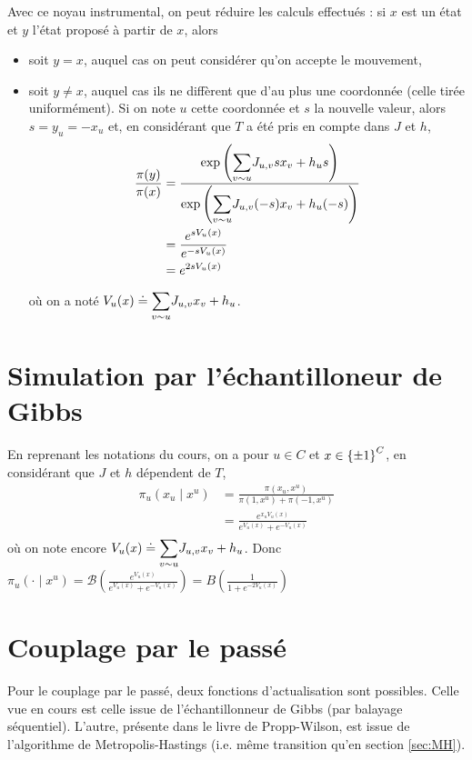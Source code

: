 \documentclass[a4paper,11pt]{article}
\begin{document}
Avec ce noyau instrumental, on peut réduire les calculs effectués : si $x$ est un état et $y$ l'état proposé à partir de $x$, alors
\begin{itemize}
	\item soit $y = x$, auquel cas on peut considérer qu'on accepte le mouvement,
	\item soit $y \neq x$, auquel cas ils ne diffèrent que d'au plus une coordonnée (celle tirée uniformément). Si on note $u$ cette coordonnée et $s$ la nouvelle valeur, alors $s = y_u = - x_u$ et, en considérant que $T$ a été pris en compte dans $J$ et $h$,
	\begin{align*}
	\frac{\pi(y)}{\pi(x)}
	&= \frac{\exp \left( \displaystyle{\sum_{v \sim u}^{}} J_{u,v} s x_{v} + h_{u} s \right)}{\exp \left( \displaystyle{\sum_{v \sim u}^{}} J_{u,v} (-s) x_{v} + h_{u} (-s) \right)}\\
	&= \frac{e^{s V_u(x)}}{e^{-s V_u(x)}}\\
	&= e^{2 s V_u(x)}
	\end{align*}
	où on a noté $V_u(x) \doteq \displaystyle{\sum_{v \sim u}^{}} J_{u,v} x_v + h_u$.
\end{itemize}

\section{Simulation par l'échantilloneur de Gibbs}

En reprenant les notations du cours, on a pour $u \in C$ et $x \in \left\lbrace \pm 1 \right\rbrace^C$, en considérant que $J$ et $h$ dépendent de $T$,
\begin{align*}
\pi_u(x_u \mid x^u)
&= \frac{\pi(x_u,x^u)}{\pi(1,x^u) + \pi(-1,x^u)}\\
&= \frac{e^{x_u V_u(x)}}{e^{V_u(x)} + e^{-V_u(x)}}
\end{align*}
où on note encore $V_u(x) \doteq \displaystyle{\sum_{v \sim u}^{}} J_{u,v} x_v + h_u$. Donc $\pi_u(\cdot \mid x^u) = \mathcal B(\frac{e^{V_u(x)}}{e^{V_u(x)} + e^{-V_u(x)}}) = B(\frac{1}{1 + e^{-2V_u(x)}})$

\section{Couplage par le passé}

Pour le couplage par le passé, deux fonctions d'actualisation sont possibles. Celle vue en cours est celle issue de l'échantillonneur de Gibbs (par balayage séquentiel). L'autre, présente dans le livre de Propp-Wilson, est issue de l'algorithme de Metropolis-Hastings (i.e. même transition qu'en section \ref{sec:MH}).
\end{document}
